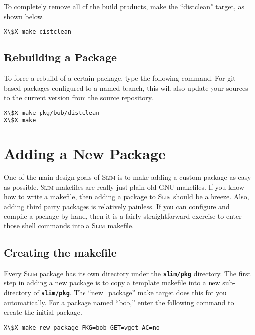 \documentclass[a4paper,10pt]{article}
\newcommand{\slim}{\textsc{Slim}\xspace}
\newcommand{\fw}{\tt\bf}
\begin{document}
    To completely remove all of the build products, make the
    ``distclean'' target, as shown below.

\begin{lstlisting}[language=bash,escapechar=X]
X\$X make distclean
\end{lstlisting}

\subsection{Rebuilding a Package}

    To force a rebuild of a certain package, type the following
    command. For git-based packages configured to a named branch, this
    will also update your sources to the current version from the
    source repository.

\begin{lstlisting}[language=bash,escapechar=X]
X\$X make pkg/bob/distclean
X\$X make
\end{lstlisting}

\section{Adding a New Package}

    One of the main design goals of \slim is to make adding a custom
    package as easy as possible. \slim makefiles are really just plain
    old GNU makefiles. If you know how to write a makefile, then
    adding a package to \slim should be a breeze. Also, adding third
    party packages is relatively painless. If you can configure and
    compile a package by hand, then it is a fairly straightforward
    exercise to enter those shell commands into a \slim makefile.

\subsection{Creating the makefile}\label{MakeNew}

    Every \slim package has its own directory under the {\fw slim/pkg}
    directory. The first step in adding a new package is to copy a
    template makefile into a new sub-directory of {\fw slim/pkg}. The
    ``new\_package'' make target does this for you automatically. For a
    package named ``bob,'' enter the following command to create the
    initial package.

\begin{lstlisting}[language=bash,escapechar=X]
X\$X make new_package PKG=bob GET=wget AC=no
\end{lstlisting}
\end{document}
